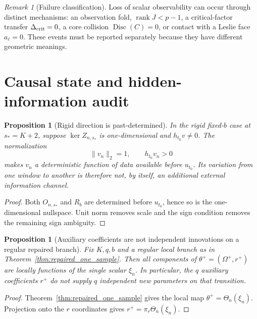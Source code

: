 \documentclass[11pt]{amsart}
\numberwithin{equation}{section}
\theoremstyle{plain}
\newtheorem{proposition}[theorem]{Proposition}
\theoremstyle{definition}
\theoremstyle{remark}
\newtheorem{remark}[theorem]{Remark}
\begin{document}
\begin{remark}[Failure classification]
\label{rem:v9_failure_classification}
Loss of scalar observability can occur through distinct mechanisms: an observation fold,
$\operatorname{rank}J<p-1$, a critical-factor transfer $\Delta_{\rm crit}=0$, a core collision
$\operatorname{Disc}(C)=0$, or contact with a Leslie face $a_\ell=0$.  These events must be
reported separately because they have different geometric meanings.
\end{remark}

\section{Causal state and hidden-information audit}
\label{sec:hidden_information}

\begin{proposition}[Rigid direction is past-determined]
\label{prop:rigid_direction_past}
In the rigid fixed-$b$ case at $s_*=K+2$, suppose $\ker Z_{n,s_*}$ is one-dimensional and $h_{t_0}v\neq0$. The normalization
\begin{equation}\|v_n\|_2=1,\qquad h_{t_0}v_n>0\label{eq:canonical_v_normalization}\end{equation}
makes $v_n$ a deterministic function of data available before $u_{t_0}$. Its variation from one window to another is therefore not, by itself, an additional external information channel.
\end{proposition}

\begin{proof}
Both $O_{n,s_*}$ and $R_b$ are determined before $u_{t_0}$, hence so is the one-dimensional nullspace. Unit norm removes scale and the sign condition removes the remaining sign ambiguity.
\end{proof}

\begin{proposition}[Auxiliary coefficients are not independent innovations on a regular repaired branch]
\label{prop:aux_not_independent}
Fix $K,q,b$ and a regular local branch as in Theorem~\ref{thm:repaired_one_sample}. Then all components of $\theta^+=(\Omega^+,r^+)$ are locally functions of the single scalar $\xi_n$. In particular, the $q$ auxiliary coefficients $r^+$ do not supply $q$ independent new parameters on that transition.
\end{proposition}

\begin{proof}
Theorem~\ref{thm:repaired_one_sample} gives the local map $\theta^+=\Theta_n(\xi_n)$. Projection onto the $r$ coordinates gives $r^+=\pi_r\Theta_n(\xi_n)$.
\end{proof}
\end{document}
